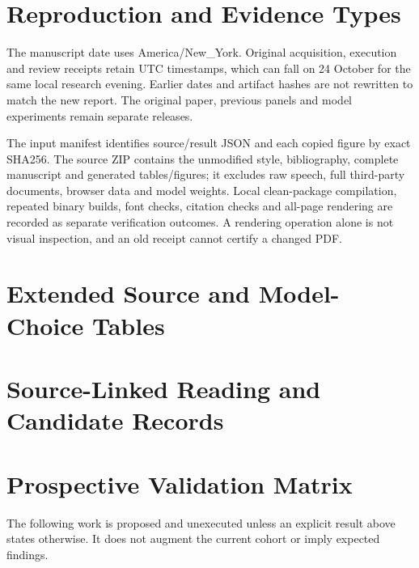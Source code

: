 \section{Reproduction and Evidence Types}


The manuscript date uses America/New\_York. Original acquisition, execution and review receipts retain UTC timestamps, which can fall on 24 October for the same local research evening. Earlier dates and artifact hashes are not rewritten to match the new report. The original paper, previous panels and model experiments remain separate releases.

The input manifest identifies source/result JSON and each copied figure by exact SHA256. The source ZIP contains the unmodified style, bibliography, complete manuscript and generated tables/figures; it excludes raw speech, full third-party documents, browser data and model weights. Local clean-package compilation, repeated binary builds, font checks, citation checks and all-page rendering are recorded as separate verification outcomes. A rendering operation alone is not visual inspection, and an old receipt cannot certify a changed PDF.

\section{Extended Source and Model-Choice Tables}


\section{Source-Linked Reading and Candidate Records}


\section{Prospective Validation Matrix}
The following work is proposed and unexecuted unless an explicit result above states otherwise. It does not augment the current cohort or imply expected findings.

